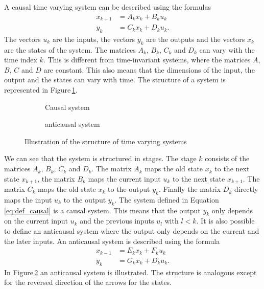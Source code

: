 \documentclass[numbers=noenddot,doctype=mastersthesis,BCOR=15mm,biblatex]{ldvbook}%
\begin{document}
A causal time varying system can be described using the formulas
\begin{subequations}
	\begin{align}
	x_{k+1} &= A_k x_k + B_k u_k \\
	y_k &= C_k x_k + D_k u_k 
	.
	\end{align}
	\label{eq:def_causal}
\end{subequations}
The vectors $u_k$ are the inputs, the vectors $y_k$ are the outputs and the vectors $x_k$ are the states of the system.
The matrices $A_k$, $B_k$, $C_k$ and $D_k$ can vary with the time index $k$.
This is different from time-invariant systems, where the matrices $A$, $B$, $C$ and $D$ are constant.
This also means that the dimensions of the input, the output and the states can vary with time.
The structure of a system is represented in Figure\,\ref{fig:struktur-system_a}.
\begin{figure}[htb]
	\centering
	\begin{subfigure}[b]{0.45\textwidth}
		\centering
		
		\caption{Causal system}
		\label{fig:struktur-system_a}
	\end{subfigure}
	\hspace{0.8cm}
	\begin{subfigure}[b]{0.45\textwidth}
		\centering
		
		\caption{anticausal system}
		\label{fig:struktur-system_b}
	\end{subfigure}
	\caption{Illustration of the structure of time varying systems}
	\label{fig:struktur-system}
\end{figure}
We can see that the system is structured in stages.
The stage $k$ consists of the matrices $A_k$, $B_k$, $C_k$ and $D_k$.
The matrix $A_k$ maps the old state $x_k$ to the next state $x_{k+1}$, the matrix $B_k$ maps the current input $u_k$ to the next state $x_{k+1}$.
The matrix $C_k$ maps the old state $x_k$ to the output $y_k$.
Finally the matrix $D_k$ directly maps the input $u_k$ to the output $y_k$.
The system defined in Equation\,\ref{eq:def_causal} is a causal system.
This means that the output $y_k$ only depends on the current input $u_k$ and the previous inputs $u_l$ with $l < k$.
It is also possible to define an anticausal system where the output only depends on the current and the later inputs.
An anticausal system is described using the formula
\begin{subequations}
	\begin{align}
	x_{k-1} &= E_k x_k + F_k u_k \\
	y_k &= G_k x_k + D_k u_k 
	.
	\end{align}
	\label{eq:def_anticausal}
\end{subequations}
In Figure\,\ref{fig:struktur-system_b} an anticausal system is illustrated.
The structure is analogous except for the reversed direction of the arrows for the states.
\end{document}
